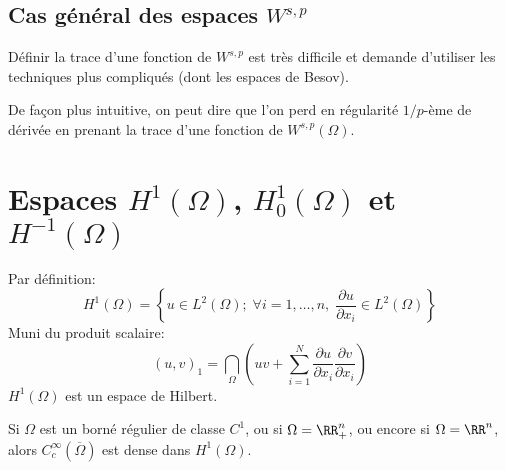 \medskip
\subsection{Cas général des espaces $W^{s,p}$}

Définir la trace d'une fonction de $W^{s,p}$ est très difficile et demande d'utiliser les techniques
plus compliqués (dont les espaces de Besov).

De façon plus intuitive, on peut dire que l'on perd en régularité $1/p$-ème de dérivée en prenant
la trace d'une fonction de $W^{s,p}(\Omega)$.






\medskip
\section{Espaces $H^1(\Omega)$, $H^1_0(\Omega)$ et $H^{-1}(\Omega)$}

Par définition:
\begin{equation}
H^1(\Omega)=\left\lbrace u\in L^2(\Omega);\; \forall i =1,\ldots,n,\; \frac{\partial u}{\partial x_i}\in L^2(\Omega) \right\rbrace
\end{equation}
Muni du produit scalaire:
\begin{equation}(u,v)_1 = \dint_{\Omega} \left(uv + \sum_{i=1}^N \frac{\partial u}{\partial x_i} \frac{\partial v}{\partial x_i} \right )\end{equation} $H^1(\Omega)$ est un espace de Hilbert.



\medskip
\begin{theoreme}
Si $\Omega$ est un borné régulier de classe $C^1$, ou si $\Omega=\RR^n_+$, ou encore si
$\Omega=\RR^n$, alors $C_c^\infty(\overline{\Omega})$ est dense dans $H^1(\Omega)$.
\end{theoreme}

